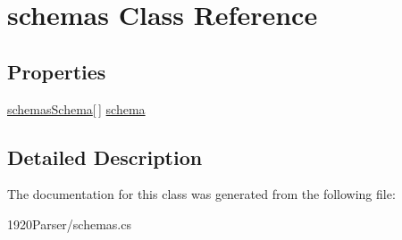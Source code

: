 \hypertarget{classschemas}{}\section{schemas Class Reference}
\label{classschemas}


 


\subsection*{Properties}
\begin{DoxyCompactItemize}
\item 
\hyperlink{classschemas_schema}{schemas\+Schema}\mbox{[}$\,$\mbox{]} \hyperlink{classschemas_adf132f5b1f6ac5984256a262fac2bb1b}{schema}\hypertarget{classschemas_adf132f5b1f6ac5984256a262fac2bb1b}{}\label{classschemas_adf132f5b1f6ac5984256a262fac2bb1b}

\end{DoxyCompactItemize}


\subsection{Detailed Description}


The documentation for this class was generated from the following file\+:\begin{DoxyCompactItemize}
\item 
1920\+Parser/schemas.\+cs\end{DoxyCompactItemize}
